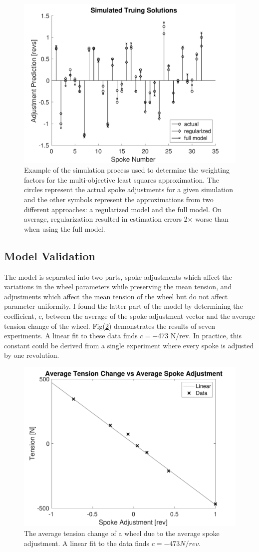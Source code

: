 \documentclass[journal]{IEEEtran}
\begin{document}
\begin{figure}[!t]
\centering
\includegraphics[width=3.25 in]{./figs/simd2}
\caption{Example of the simulation process used to determine the weighting factors for the multi-objective least squares approximation. The circles represent the actual spoke adjustments for a given simulation and the other symbols represent the approximations from two different approaches: a regularized model and the full model.  On average, regularization resulted in estimation errors 2$\times$ worse than when using the full model.}
\label{fig:simd}
\end{figure}

\subsection{Model Validation}
The model is separated into two parts, spoke adjustments which affect the variations in the wheel parameters while preserving the mean tension, and adjustments which affect the mean tension of the wheel but do not affect parameter uniformity.  I found the latter part of the model by determining the coefficient, $c$, between the average of the spoke adjustment vector and the average tension change of the wheel.  Fig(\ref{fig:c}) demonstrates the results of seven experiments. A linear fit to these data finds $c=-$473 N/rev. In practice, this constant could be derived from a single experiment where every spoke is adjusted by one revolution. 

 \begin{figure}[!t]
\centering
\includegraphics[width=3.25 in]{./figs/c}
\caption{The average tension change of a wheel due to the average spoke adjustment. A linear fit to the data finds $c=-473 N/rev$.}
\label{fig:c}
\end{figure}
\end{document}
